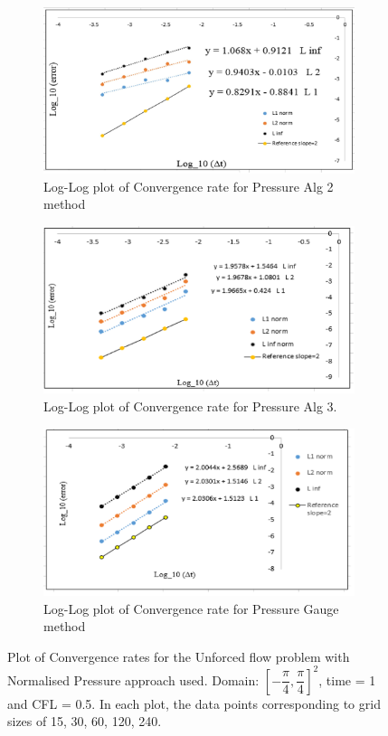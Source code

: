 \begin{figure}[H]
	\centering
	\begin{subfigure}[t]{4.5in}
		\centering
		\includegraphics[width=4.5in]{figures/Pm1b_unf1_np_P_rate.jpg}
		\caption{Log-Log plot of Convergence rate for Pressure Alg 2 method}\label{fig:6.19a}		
	\end{subfigure}
	\quad
	\begin{subfigure}[t]{4.5in}
		\centering
		\includegraphics[width=4.5in]{figures/Pm2_unf1_np_P_rate.jpg}
		\caption{Log-Log plot of Convergence rate for Pressure Alg 3. }\label{fig:6.19b}
	\end{subfigure}
	\quad
	\begin{subfigure}[t]{4.5in}
		\centering
		\includegraphics[width=4.5in]{figures/Gauge_unf1_np_P_rate.jpg}
		\caption{Log-Log plot of Convergence rate for Pressure Gauge method }\label{fig:6.19b}
	\end{subfigure}
	\caption{Plot of Convergence rates for the Unforced flow problem with Normalised Pressure approach used. Domain: $[-\dfrac{\pi}{4}, \dfrac{\pi}{4}]^2$, time = 1 and CFL = 0.5. In each plot, the data points corresponding to grid sizes of 15, 30, 60, 120, 240.}\label{fig:6.16}
\end{figure}

